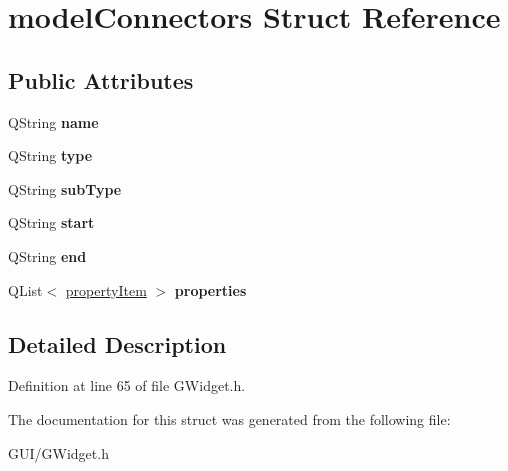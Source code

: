 \hypertarget{structmodel_connectors}{}\section{model\+Connectors Struct Reference}
\label{structmodel_connectors}
\subsection*{Public Attributes}
\begin{DoxyCompactItemize}
\item 
\mbox{\label{structmodel_connectors_aae33e5fbdf45dcea46329f0998a48f7c}} 
Q\+String {\bfseries name}
\item 
\mbox{\label{structmodel_connectors_a2ebef30a30bf5fdd66c9e38cb14908fa}} 
Q\+String {\bfseries type}
\item 
\mbox{\label{structmodel_connectors_a0135141452e97e37de8a183c66d54fe2}} 
Q\+String {\bfseries sub\+Type}
\item 
\mbox{\label{structmodel_connectors_aaa4604ac674523b19aeea1f5627e96f4}} 
Q\+String {\bfseries start}
\item 
\mbox{\label{structmodel_connectors_aa9447dd52bd6a9103d4b47fc8be0834e}} 
Q\+String {\bfseries end}
\item 
\mbox{\label{structmodel_connectors_a3e6fe484981b0f1bfe307961613c6b6f}} 
Q\+List$<$ \hyperlink{structproperty_item}{property\+Item} $>$ {\bfseries properties}
\end{DoxyCompactItemize}


\subsection{Detailed Description}


Definition at line 65 of file G\+Widget.\+h.



The documentation for this struct was generated from the following file\+:\begin{DoxyCompactItemize}
\item 
G\+U\+I/G\+Widget.\+h\end{DoxyCompactItemize}
